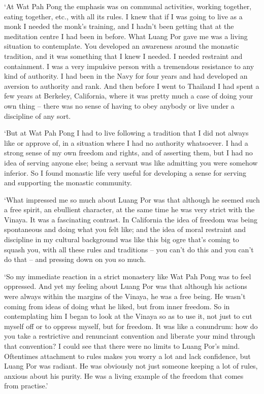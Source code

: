 `At Wat Pah Pong the emphasis was on communal activities, working
together, eating together, etc., with all its rules. I knew that if I
was going to live as a monk I needed the monk's training, and I hadn't
been getting that at the meditation centre I had been in before. What
Luang Por gave me was a living situation to contemplate. You developed
an awareness around the monastic tradition, and it was something that I
knew I needed. I needed restraint and containment. I was a very
impulsive person with a tremendous resistance to any kind of authority. 
I had been in the Navy for four years and had developed an aversion to
authority and rank. And then before I went to Thailand I had spent a few
years at Berkeley, California, where it was pretty much a case of doing
your own thing -- there was no sense of having to obey anybody or live
under a discipline of any sort.

`But at Wat Pah Pong I had to live
following a tradition that I did not always like or approve of, in a
situation where I had no authority whatsoever. I had a strong sense of
my own freedom and rights, and of asserting them, but I had no idea of
serving anyone else; being a servant was like admitting you were somehow
inferior. So I found monastic life very useful for developing a sense
for serving and supporting the monastic community.

`What impressed me so much about Luang Por was that although he seemed
such a free spirit, an ebullient character, at the same time he was very
strict with the Vinaya. It was a fascinating contrast. In California the
idea of freedom was being spontaneous and doing what you felt like; and
the idea of moral restraint and discipline in my cultural background was
like this big ogre that's coming to squash you, with all these rules and
traditions -- you can't do this and you can't do that -- and pressing
down on you so much.

`So my immediate reaction in a strict monastery like Wat Pah Pong was to
feel oppressed. And yet my feeling about Luang Por was that although his
actions were always within the margins of the Vinaya, he was a free
being. He wasn't coming from ideas of doing what he liked, but from
inner freedom. So in contemplating him I began to look at the Vinaya so
as to use it, not just to cut myself off or to oppress myself, but for
freedom. It was like a conundrum: how do you take a restrictive and
renunciant convention and liberate your mind through that convention? I
could see that there were no limits to Luang Por's mind. Oftentimes
attachment to rules makes you worry a lot and lack confidence, but Luang
Por was radiant. He was obviously not just someone keeping a lot of
rules, anxious about his purity. He was a living example of the freedom
that comes from practise.'

